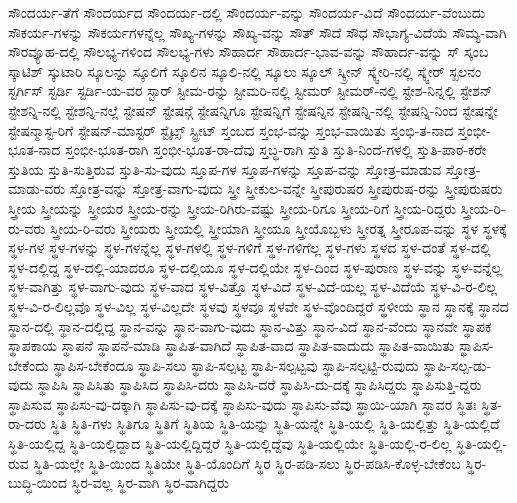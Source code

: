 {ಸೌಂದರ್ಯ-ತೆಗೆ
ಸೌಂದರ್ಯದ
ಸೌಂದರ್ಯ-ದಲ್ಲಿ
ಸೌಂದರ್ಯ-ವನ್ನು
ಸೌಂದರ್ಯ-ವಿದೆ
ಸೌಂದರ್ಯ-ವೆಂಬುದು
ಸೌಕರ್ಯ-ಗಳನ್ನು
ಸೌಕರ್ಯಗಳನ್ನೆಲ್ಲ
ಸೌಖ್ಯ-ಗಳನ್ನು
ಸೌಖ್ಯ-ವನ್ನು
ಸೌತ್
ಸೌದೆ
ಸೌಧ
ಸೌಭಾಗ್ಯ-ವಿದೆಯೆ
ಸೌಮ್ಯ-ವಾಗಿ
ಸೌರವ್ಯೂಹ-ದಲ್ಲಿ
ಸೌಲಭ್ಯ-ಗಳಿಂದ
ಸೌಲಭ್ಯ-ಗಳು
ಸೌಹಾರ್ದ
ಸೌಹಾರ್ದ-ಭಾವ-ವನ್ನು
ಸೌಹಾರ್ದ-ವನ್ನು
ಸ್
ಸ್ಕಂಬ
ಸ್ಕಾಟಿಶ್
ಸ್ಕುಟಾರಿ
ಸ್ಕೂಲನ್ನು
ಸ್ಕೂಲಿಗೆ
ಸ್ಕೂಲಿನ
ಸ್ಕೂಲಿ-ನಲ್ಲಿ
ಸ್ಕೂಲು
ಸ್ಕೂಲ್
ಸ್ಕ್ರೀನ್
ಸ್ಕ್ವೇರಿ-ನಲ್ಲಿ
ಸ್ಕ್ವೇರ್
ಸ್ಖಲನಂ
ಸ್ಟರ್ಗಿಸ್
ಸ್ಟರ್ಡಿ
ಸ್ಟರ್ಡಿ-ಯ-ವರ
ಸ್ಟಾರ್
ಸ್ಟೀಮ-ರನ್ನು
ಸ್ಟೀಮರಿ-ನಲ್ಲಿ
ಸ್ಟೀಮರ್
ಸ್ಟೀಮರ್-ನಲ್ಲಿ
ಸ್ಟೇಶ-ನಿನ್ನಲ್ಲಿ
ಸ್ಟೇಶನ್
ಸ್ಟೇಶನ್ನಿ-ನಲ್ಲಿ
ಸ್ಟೇಶನ್ನಿ-ನಲ್ಲೆ
ಸ್ಟೇಷನ್
ಸ್ಟೇಷನ್ಗೆ
ಸ್ಟೇಷನ್ನಿಗೂ
ಸ್ಟೇಷನ್ನಿಗೆ
ಸ್ಟೇಷನ್ನಿನ
ಸ್ಟೇಷನ್ನಿ-ನಲ್ಲಿ
ಸ್ಟೇಷನ್ನಿ-ನಿಂದ
ಸ್ಟೇಷನ್ನೇ
ಸ್ಟೇಷನ್ಮಾಸ್ಟ-ರಿಗೆ
ಸ್ಟೇಷನ್-ಮಾಸ್ಟರ್
ಸ್ಟೈಟ್ಸ್
ಸ್ಟ್ರೀಟ್
ಸ್ತಂಬದ
ಸ್ತಂಭ-ವನ್ನು
ಸ್ತಂಭ-ವಾಯಿತು
ಸ್ತಂಭಿ-ತ-ನಾದ
ಸ್ತಂಭೀ-ಭೂತ-ನಾದ
ಸ್ತಂಭೀ-ಭೂತ-ರಾಗಿ
ಸ್ತಂಭೀ-ಭೂತ-ರಾ-ದೆವು
ಸ್ತಬ್ಧ-ರಾಗಿ
ಸ್ತುತಿ
ಸ್ತುತಿ-ನಿಂದೆ-ಗಳಲ್ಲಿ
ಸ್ತುತಿ-ಪಾಠ-ಕರೇ
ಸ್ತುತಿಯ
ಸ್ತುತಿ-ಸುತ್ತಿರುವ
ಸ್ತುತಿ-ಸು-ವುದು
ಸ್ತೂಪ-ಗಳ
ಸ್ತೂಪ-ಗಳನ್ನು
ಸ್ತೂಪ-ವನ್ನು
ಸ್ತೋತ್ರ-ಮಾಡುವ
ಸ್ತೋತ್ರ-ಮಾಡು-ವರು
ಸ್ತೋತ್ರ-ವನ್ನು
ಸ್ತೋತ್ರ-ವಾಗು-ವುದು
ಸ್ತ್ರೀ
ಸ್ತ್ರೀಕುಲ-ವನ್ನೇ
ಸ್ತ್ರೀಪುರುಷರ
ಸ್ತ್ರೀಪುರುಷ-ರನ್ನು
ಸ್ತ್ರೀಪುರುಷರು
ಸ್ತ್ರೀಯ
ಸ್ತ್ರೀಯನ್ನು
ಸ್ತ್ರೀಯರ
ಸ್ತ್ರೀಯ-ರನ್ನು
ಸ್ತ್ರೀಯ-ರಿಗಿರು-ವಷ್ಟು
ಸ್ತ್ರೀಯ-ರಿಗೂ
ಸ್ತ್ರೀಯ-ರಿಗೆ
ಸ್ತ್ರೀಯ-ರಿದ್ದರು
ಸ್ತ್ರೀಯ-ರಿ-ರು-ವರು
ಸ್ತ್ರೀಯ-ರಿ-ವರು
ಸ್ತ್ರೀಯರು
ಸ್ತ್ರೀಯಲ್ಲಿ
ಸ್ತ್ರೀಯಾಗಿ
ಸ್ತ್ರೀಯೂ
ಸ್ತ್ರೀಯೊಬ್ಬಳು
ಸ್ತ್ರೀರತ್ನ
ಸ್ತ್ರೀರೂಪ-ವನ್ನು
ಸ್ಥಳ
ಸ್ಥಳಕ್ಕೆ
ಸ್ಥಳ-ಗಳ
ಸ್ಥಳ-ಗಳನ್ನು
ಸ್ಥಳ-ಗಳನ್ನೆಲ್ಲ
ಸ್ಥಳ-ಗಳಲ್ಲಿ
ಸ್ಥಳ-ಗಳಿಗೆ
ಸ್ಥಳ-ಗಳಿಗೆಲ್ಲ
ಸ್ಥಳ-ಗಳು
ಸ್ಥಳದ
ಸ್ಥಳ-ದಂತೆ
ಸ್ಥಳ-ದಲ್ಲಿ
ಸ್ಥಳ-ದಲ್ಲಿದ್ದ
ಸ್ಥಳ-ದಲ್ಲಿ-ಯಾದರೂ
ಸ್ಥಳ-ದಲ್ಲಿಯೂ
ಸ್ಥಳ-ದಲ್ಲಿಯೇ
ಸ್ಥಳ-ದಿಂದ
ಸ್ಥಳ-ಪುರಾಣ
ಸ್ಥಳ-ವನ್ನು
ಸ್ಥಳ-ವನ್ನೆಲ್ಲ
ಸ್ಥಳ-ವಾಗಿತ್ತು
ಸ್ಥಳ-ವಾಗು-ವುದು
ಸ್ಥಳ-ವಾದ
ಸ್ಥಳ-ವಿತ್ತೊ
ಸ್ಥಳ-ವಿದೆ
ಸ್ಥಳ-ವಿದೆ-ಯಲ್ಲ
ಸ್ಥಳ-ವಿದೆಯೆ
ಸ್ಥಳ-ವಿ-ರ-ಲಿಲ್ಲ
ಸ್ಥಳ-ವಿ-ರ-ಲಿಲ್ಲವೊ
ಸ್ಥಳ-ವಿಲ್ಲ
ಸ್ಥಳ-ವಿಲ್ಲದೇ
ಸ್ಥಳವು
ಸ್ಥಳವೂ
ಸ್ಥಳವೇ
ಸ್ಥಳ-ವೊಂದಿದ್ದರೆ
ಸ್ಥಳೀಯ
ಸ್ಥಾನ
ಸ್ಥಾನಕ್ಕೆ
ಸ್ಥಾನದ
ಸ್ಥಾನ-ದಲ್ಲಿ
ಸ್ಥಾನ-ದಲ್ಲಿದ್ದ
ಸ್ಥಾನ-ವನ್ನು
ಸ್ಥಾನ-ವಾಗು-ವುದು
ಸ್ಥಾನ-ವಿತ್ತು
ಸ್ಥಾನ-ವಿದೆ
ಸ್ಥಾನ-ವೆಂದು
ಸ್ಥಾನವೇ
ಸ್ಥಾಪಕ
ಸ್ಥಾಪಕಾಯ
ಸ್ಥಾಪನೆ
ಸ್ಥಾಪನೆ-ಮಾಡಿ
ಸ್ಥಾಪಿತ-ವಾಗಿದೆ
ಸ್ಥಾಪಿತ-ವಾದ
ಸ್ಥಾಪಿತ-ವಾದುದು
ಸ್ಥಾಪಿತ-ವಾಯಿತು
ಸ್ಥಾಪಿಸ-ಬೇಕೆಂದು
ಸ್ಥಾಪಿಸ-ಬೇಕೆಂದೂ
ಸ್ಥಾಪಿ-ಸಲು
ಸ್ಥಾಪಿ-ಸಲ್ಪಟ್ಟ
ಸ್ಥಾಪಿ-ಸಲ್ಪಟ್ಟವು
ಸ್ಥಾಪಿ-ಸಲ್ಪಟ್ಟಿ-ರುವುದು
ಸ್ಥಾಪಿ-ಸಲ್ಪ-ಡು-ವುದು
ಸ್ಥಾಪಿಸಿ
ಸ್ಥಾಪಿಸಿತು
ಸ್ಥಾಪಿಸಿದ
ಸ್ಥಾಪಿಸಿ-ದರು
ಸ್ಥಾಪಿಸಿ-ದರೆ
ಸ್ಥಾಪಿಸಿ-ದು-ದಕ್ಕೆ
ಸ್ಥಾಪಿಸಿದ್ದರು
ಸ್ಥಾಪಿಸುತ್ತಿ-ದ್ದರು
ಸ್ಥಾಪಿಸುವ
ಸ್ಥಾಪಿಸು-ವು-ದಕ್ಕಾಗಿ
ಸ್ಥಾಪಿಸು-ವು-ದಕ್ಕೆ
ಸ್ಥಾಪಿಸು-ವುದು
ಸ್ಥಾಪಿಸು-ವೆವು
ಸ್ಥಾಯಿ-ಯಾಗಿ
ಸ್ಥಾವರ
ಸ್ಥಿತಃ
ಸ್ಥಿತ-ರಾ-ದರು
ಸ್ಥಿತಿ
ಸ್ಥಿತಿ-ಗಳು
ಸ್ಥಿತಿಗೂ
ಸ್ಥಿತಿಗೆ
ಸ್ಥಿತಿಯ
ಸ್ಥಿತಿ-ಯನ್ನು
ಸ್ಥಿತಿ-ಯನ್ನೇ
ಸ್ಥಿತಿ-ಯಲ್ಲಿ
ಸ್ಥಿತಿ-ಯಲ್ಲಿತ್ತು
ಸ್ಥಿತಿ-ಯಲ್ಲಿದೆ
ಸ್ಥಿತಿ-ಯಲ್ಲಿದ್ದ
ಸ್ಥಿತಿ-ಯಲ್ಲಿದ್ದಾದ
ಸ್ಥಿತಿ-ಯಲ್ಲಿದ್ದಿದ್ದರೆ
ಸ್ಥಿತಿ-ಯಲ್ಲಿದ್ದೆವು
ಸ್ಥಿತಿ-ಯಲ್ಲಿಯೇ
ಸ್ಥಿತಿ-ಯಲ್ಲಿ-ರ-ಲಿಲ್ಲ
ಸ್ಥಿತಿ-ಯಲ್ಲಿ-ರುವ
ಸ್ಥಿತಿ-ಯಲ್ಲೇ
ಸ್ಥಿತಿ-ಯಿಂದ
ಸ್ಥಿತಿಯೇ
ಸ್ಥಿತಿ-ಯೊಂದಿಗೆ
ಸ್ಥಿರ
ಸ್ಥಿರ-ಪಡಿ-ಸಲು
ಸ್ಥಿರ-ಪಡಿಸಿ-ಕೊಳ್ಳ-ಬೇಕೆಂಬ
ಸ್ಥಿರ-ಬುದ್ಧಿ-ಯಿಂದ
ಸ್ಥಿರ-ವಲ್ಲ
ಸ್ಥಿರ-ವಾಗಿ
ಸ್ಥಿರ-ವಾಗಿದ್ದರು
}
